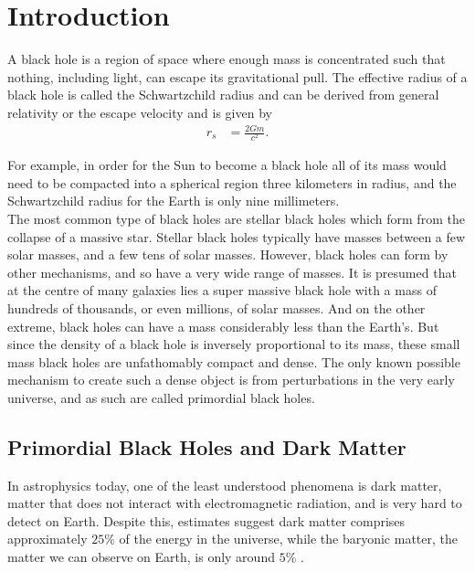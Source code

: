 %
%
%
%
%

\chapter{Introduction}
\label{chap:intro}

A black hole is a region of space where enough mass is concentrated such that nothing, including light, can escape its gravitational pull. The effective radius of a black hole is called the Schwartzchild radius and can be derived from general relativity or the escape velocity and is given by
\begin{align*}
r_s &= \frac{2Gm}{c^2}.
\end{align*}

For example, in order for the Sun to become a black hole all of its mass would need to be compacted into a spherical region three kilometers in radius, and the Schwartzchild radius for the Earth is only nine millimeters. \\

The most common type of black holes are stellar black holes which form from the collapse of a massive star. Stellar black holes typically have masses between a few solar masses, and a few tens of solar masses. However, black holes can form by other mechanisms, and so have a very wide range of masses. It is presumed that at the centre of many galaxies lies a super massive black hole with a mass of hundreds of thousands, or even millions, of solar masses. And on the other extreme, black holes can have a mass considerably less than the Earth's. But since the density of a black hole is inversely proportional to its mass, these small mass black holes are unfathomably compact and dense. The only known possible mechanism to create such a dense object is from perturbations in the very early universe, and as such are called primordial black holes.

\section{Primordial Black Holes and Dark Matter}

In astrophysics today, one of the least understood phenomena is dark matter, matter that does not interact with electromagnetic radiation, and is very hard to detect on Earth. Despite this, estimates suggest dark matter comprises approximately $25\%$ of the energy in the universe, while the baryonic matter, the matter we can observe on Earth, is only around $5\%$ \cite{critdens, cosmology}. \\

